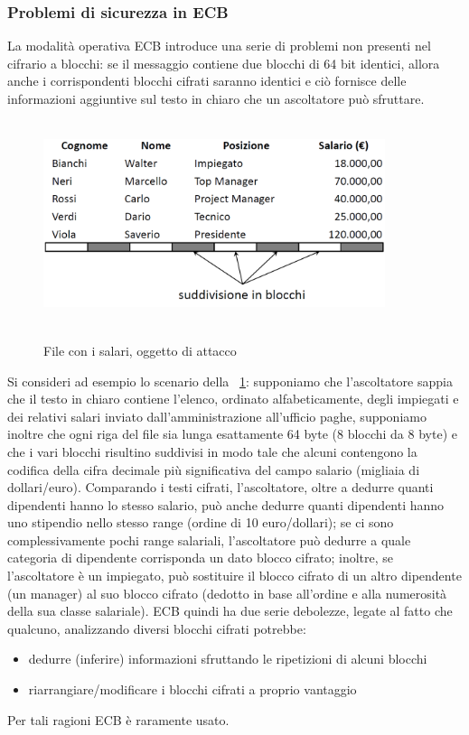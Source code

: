 \subsubsection{Problemi di sicurezza in ECB}
La modalità operativa ECB introduce una serie di problemi non presenti nel cifrario a blocchi: se il messaggio contiene due blocchi di 64 bit identici, allora anche i corrispondenti blocchi cifrati saranno identici e ciò fornisce delle informazioni aggiuntive sul testo in chiaro che un ascoltatore può sfruttare.
\begin{figure}
\centering%
	\subfigure%
	{\includegraphics[height=6cm, width=10cm, keepaspectratio]{Immagini/Capitolo3/File_salari.png}}
	\caption{File con i salari, oggetto di attacco \label{fig:File_salari}} 	
\end{figure}
Si consideri ad esempio lo scenario della \figurename ~\ref{fig:File_salari}: supponiamo che l'ascoltatore sappia che il testo in chiaro contiene l'elenco, ordinato alfabeticamente, degli impiegati e dei relativi salari inviato dall'amministrazione all'ufficio paghe, supponiamo inoltre che ogni riga del file sia lunga esattamente 64 byte (8 blocchi da 8 byte) e che i vari blocchi risultino suddivisi in modo tale che alcuni contengono la codifica della cifra decimale più significativa del campo salario (migliaia di dollari/euro). Comparando i testi cifrati, l'ascoltatore, oltre a dedurre quanti dipendenti hanno lo stesso salario, può anche dedurre quanti dipendenti hanno uno stipendio nello stesso range (ordine di 10 euro/dollari); se ci sono complessivamente pochi range salariali, l'ascoltatore può dedurre a quale categoria di dipendente corrisponda un dato blocco cifrato; inoltre, se l'ascoltatore è un impiegato, può sostituire il blocco cifrato di un altro dipendente (un manager) al suo blocco cifrato (dedotto in base all'ordine e alla
numerosità della sua classe salariale).\newline \newline
ECB quindi ha due serie debolezze, legate al fatto che qualcuno, analizzando diversi blocchi cifrati potrebbe:
\begin{itemize}
\item dedurre (inferire) informazioni sfruttando le ripetizioni di alcuni blocchi
\item riarrangiare/modificare i blocchi cifrati a proprio vantaggio
\end{itemize}
Per tali ragioni ECB è raramente usato.
